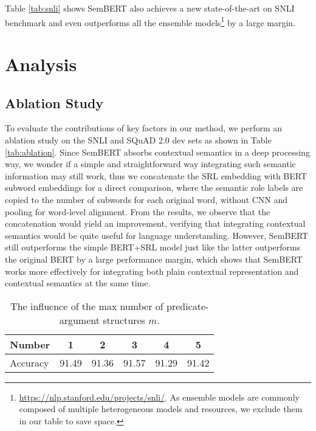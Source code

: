\documentclass[letterpaper]{article} \usepackage{aaai20}  \usepackage{times}  \usepackage{helvet} \usepackage{courier}  \usepackage[hyphens]{url}  \usepackage{graphicx} \urlstyle{rm} \def\UrlFont{\rm}  \usepackage{graphicx}  \frenchspacing  \usepackage{amssymb}
\begin{document}
	
Table \ref{tab:snli} shows SemBERT also achieves a new state-of-the-art on SNLI benchmark and even outperforms all the ensemble models\footnote[10]{\url{https://nlp.stanford.edu/projects/snli/}. As ensemble models are commonly composed of multiple heterogeneous models and resources, we exclude them in our table to save space.} by a large margin. 



\section{Analysis}\label{sec:ana}
\subsection{Ablation Study}
To evaluate the contributions of key factors in our method, we perform an ablation study on the SNLI and SQuAD 2.0 dev sets as shown in Table \ref{tab:ablation}. Since SemBERT absorbs contextual semantics in a deep processing way, we wonder if a simple and straightforward way integrating such semantic information may still work, thus we concatenate the SRL embedding with BERT subword embeddings for a direct comparison, where the semantic role labels are copied to the number of subwords for each original word, without CNN and pooling for word-level alignment. From the results, we observe that the concatenation would yield an improvement, verifying that integrating contextual semantics would be quite useful for language understanding. However, SemBERT still outperforms the simple BERT+SRL model just like the latter outperforms the original BERT by a large performance margin, which shows that SemBERT works more effectively for integrating both plain contextual representation and contextual semantics at the same time. 

\begin{table} 
	\centering
		\resizebox{\linewidth}{!}
	{
	\begin{tabular}{l c c c c c}
		\hline
		
		\hline
		Number & 1 & 2 & 3 & 4 & 5   \\ 
		\hline
		Accuracy & 91.49 & 91.36 & 91.57 & 91.29 & 91.42 \\
		\hline
		
		\hline
	\end{tabular}
}
	{
		\caption{\label{fig:m} The influence of the max number of predicate-argument structures $m$.}
	}
\end{table}
\end{document}
